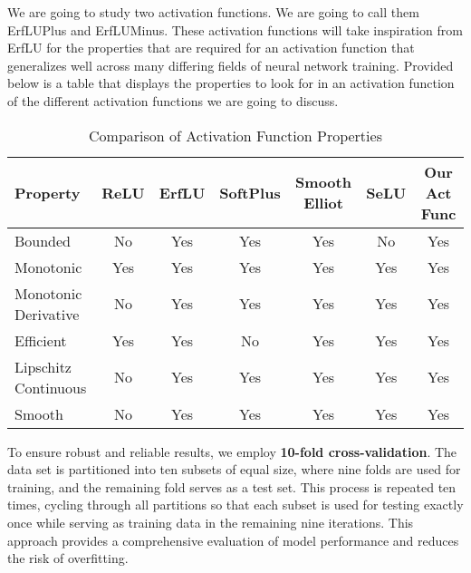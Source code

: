 \documentclass{article}
\begin{document}
 We are going to study two activation functions. We are going to call them ErfLUPlus and ErfLUMinus. These activation functions will take inspiration from ErfLU for the properties that are required for an activation function that generalizes well across many differing fields of neural network training. Provided below is a table that displays the properties to look for in an activation function of the different activation functions we are going to discuss.

\begin{table}[h]
    \begin{center}
        \renewcommand{\arraystretch}{1.3}
        \begin{tabular}{|l|c|c|c|c|c|c|}
            \hline
            \textbf{Property} & \textbf{ReLU} & \textbf{ErfLU} & \textbf{SoftPlus} & \textbf{Smooth Elliot} & \textbf{SeLU} & \textbf{Our Act Func} \\
            \hline
            Bounded                & No  & Yes  & Yes  & Yes  & No  & Yes\\
            Monotonic              & Yes & Yes  & Yes  & Yes  & Yes & Yes\\
            Monotonic Derivative   & No  & Yes  & Yes  & Yes  & Yes & Yes\\
            Efficient              & Yes & Yes  & No   & Yes  & Yes & Yes\\
            Lipschitz Continuous   & No  & Yes  & Yes  & Yes  & Yes & Yes\\
            Smooth                 & No  & Yes  & Yes  & Yes  & Yes & Yes\\
            \hline
        \end{tabular}
        \caption{Comparison of Activation Function Properties}
        \label{tab:activation_comparison}
    \end{center}
\end{table}



To ensure robust and reliable results, we employ \textbf{10-fold cross-validation}. The data set is partitioned into ten subsets of equal size, where nine folds are used for training, and the remaining fold serves as a test set. This process is repeated ten times, cycling through all partitions so that each subset is used for testing exactly once while serving as training data in the remaining nine iterations. This approach provides a comprehensive evaluation of model performance and reduces the risk of overfitting.
\end{document}
